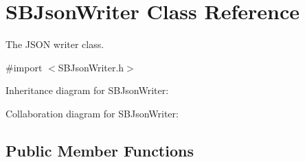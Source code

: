 \hypertarget{interface_s_b_json_writer}{
\section{\-S\-B\-Json\-Writer \-Class \-Reference}
\label{interface_s_b_json_writer}
}


\-The \-J\-S\-O\-N writer class.  




{\ttfamily \#import $<$\-S\-B\-Json\-Writer.\-h$>$}



\-Inheritance diagram for \-S\-B\-Json\-Writer\-:


\-Collaboration diagram for \-S\-B\-Json\-Writer\-:
\subsection*{\-Public \-Member \-Functions}
